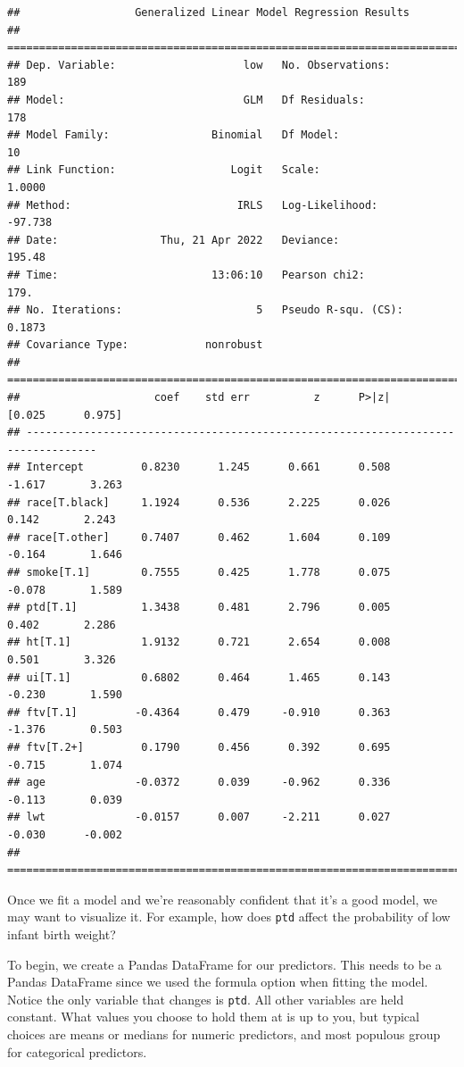 \documentclass[
]{book}
\begin{document}
\begin{verbatim}
##                  Generalized Linear Model Regression Results                  
## ==============================================================================
## Dep. Variable:                    low   No. Observations:                  189
## Model:                            GLM   Df Residuals:                      178
## Model Family:                Binomial   Df Model:                           10
## Link Function:                  Logit   Scale:                          1.0000
## Method:                          IRLS   Log-Likelihood:                -97.738
## Date:                Thu, 21 Apr 2022   Deviance:                       195.48
## Time:                        13:06:10   Pearson chi2:                     179.
## No. Iterations:                     5   Pseudo R-squ. (CS):             0.1873
## Covariance Type:            nonrobust                                         
## =================================================================================
##                     coef    std err          z      P>|z|      [0.025      0.975]
## ---------------------------------------------------------------------------------
## Intercept         0.8230      1.245      0.661      0.508      -1.617       3.263
## race[T.black]     1.1924      0.536      2.225      0.026       0.142       2.243
## race[T.other]     0.7407      0.462      1.604      0.109      -0.164       1.646
## smoke[T.1]        0.7555      0.425      1.778      0.075      -0.078       1.589
## ptd[T.1]          1.3438      0.481      2.796      0.005       0.402       2.286
## ht[T.1]           1.9132      0.721      2.654      0.008       0.501       3.326
## ui[T.1]           0.6802      0.464      1.465      0.143      -0.230       1.590
## ftv[T.1]         -0.4364      0.479     -0.910      0.363      -1.376       0.503
## ftv[T.2+]         0.1790      0.456      0.392      0.695      -0.715       1.074
## age              -0.0372      0.039     -0.962      0.336      -0.113       0.039
## lwt              -0.0157      0.007     -2.211      0.027      -0.030      -0.002
## =================================================================================
\end{verbatim}

Once we fit a model and we're reasonably confident that it's a good model, we may want to visualize it. For example, how does \texttt{ptd} affect the probability of low infant birth weight?

To begin, we create a Pandas DataFrame for our predictors. This needs to be a Pandas DataFrame since we used the formula option when fitting the model. Notice the only variable that changes is \texttt{ptd}. All other variables are held constant. What values you choose to hold them at is up to you, but typical choices are means or medians for numeric predictors, and most populous group for categorical predictors.
\end{document}
